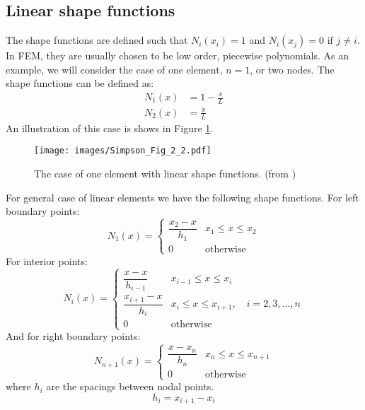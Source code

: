 \documentclass[a4paper,12pt]{article} %
\begin{document}
\subsection{Linear shape functions}
The shape functions are defined such that $N_{i}(x_{i}) = 1$ and $N_{i}(x_{j})=0$
if $j \neq i$. In FEM, they are usually chosen to be low order, piecewise polynomials.
As an example, we will consider the case of one element, $n=1$, or two nodes. The shape functions
can be defined as:
\begin{align}
N_{1}(x) & = 1 - \frac{x}{L} \\
N_{2}(x) & = \frac{x}{L}
\end{align}
An illustration of this case is shows in Figure \ref{fig:Simpson_2_2}.

\begin{figure}[H]
{\centering
\texttt{[image: images/Simpson\_Fig\_2\_2.pdf]}
\par}
\caption{The case of one element with linear shape functions. (from \cite{Simpson2017})}
\label{fig:Simpson_2_2}
\end{figure}

For general case of linear elements we have the following shape functions. For left
boundary points:
\begin{equation}
N_{1}(x) = \begin{cases}
\dfrac{x_{2} - x}{h_1} & x_{1} \leq x \leq x_{2} \\[10pt]
0                     & \text{otherwise}
\end{cases}
\end{equation}
%
For interior points:
%
\begin{equation}
N_{i}(x) = \begin{cases}
\dfrac{x - x}{h_{i-1}} & x_{i-1} \leq x \leq x_{i} \\[10pt]
\dfrac{x_{i+1} - x}{h_{i}} & x_{i} \leq x \leq x_{i+1},\quad i=2,3,\ldots,n \\[10pt]
0                     & \text{otherwise}
\end{cases}
\end{equation}
%
And for right boundary points:
%
\begin{equation}
N_{n+1}(x) = \begin{cases}
\dfrac{x - x_{n}}{h_{n}} & x_{n} \leq x \leq x_{n+1} \\[10pt]
0                     & \text{otherwise}
\end{cases}
\end{equation}
%
where $h_{i}$ are the spacings between nodal points.
%
\begin{equation}
h_{i} = x_{i+1} - x_{i}
\end{equation}
\end{document}

